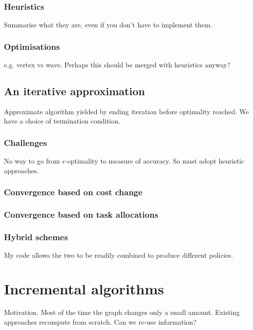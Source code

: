 \subsubsection{Heuristics}

Summarise what they are, even if you don't have to implement them.

\subsubsection{Optimisations}

e.g. vertex vs wave. Perhaps this should be merged with heuristics anyway?

\subsection{An iterative approximation}

Approximate algorithm yielded by ending iteration before optimality reached. We have a choice of termination condition.

\subsubsection{Challenges} 

No way to go from $\epsilon$-optimality to measure of accuracy. So must adopt heuristic approaches.

\subsubsection{Convergence based on cost change}

\subsubsection{Convergence based on task allocations}

\subsubsection{Hybrid schemes}

My code allows the two to be readily combined to produce different policies.

\section{Incremental algorithms}

Motivation. Most of the time the graph changes only a small amount. Existing approaches recompute from scratch. Can we re-use information?

